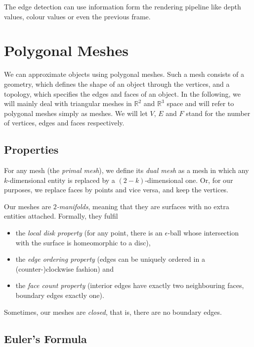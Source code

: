 \documentclass{panikzettel}
\begin{document}
The edge detection can use information form the rendering pipeline like depth values, colour values or even the previous frame.

\section{Polygonal Meshes}

We can approximate objects using polygonal meshes. Such a mesh consists of a geometry, which defines the shape of an object through the vertices, and a topology, which specifies the edges and faces of an object. In the following, we will mainly deal with triangular meshes in $\mathbb{R}^2$ and $\mathbb{R}^3$ space and will refer to polygonal meshes simply as meshes. We will let $V$, $E$ and $F$ stand for the number of vertices, edges and faces respectively.

\subsection{Properties}

For any mesh (the \emph{primal mesh}), we define its \emph{dual mesh} as a mesh in which any $k$-dimensional entity is replaced by a $(2-k)$-dimensional one. Or, for our purposes, we replace faces by points and vice versa, and keep the vertices.

Our meshes are $2$\emph{-manifolds}, meaning that they are surfaces with no extra entities attached. Formally, they fulfil

\begin{itemize}
    \item the \emph{local disk property} (for any point, there is an $\epsilon$-ball whose intersection with the surface is homeomorphic to a disc),
    \item the \emph{edge ordering property} (edges can be uniquely ordered in a (counter-)clockwise fashion) and
    \item the \emph{face count property} (interior edges have exactly two neighbouring faces, boundary edges exactly one).
\end{itemize}

Sometimes, our meshes are \emph{closed}, that is, there are no boundary edges.

\subsection{Euler's Formula}
\end{document}
